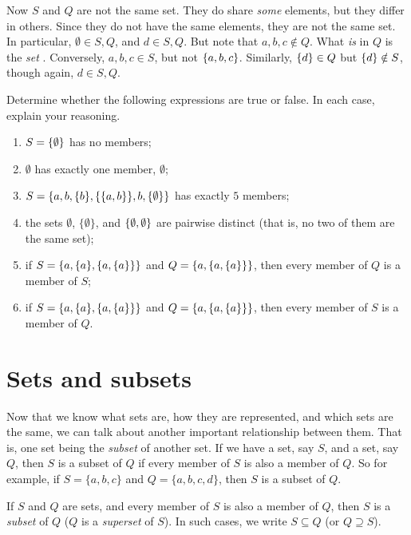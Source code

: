 Now $S$ and $Q$ are not the same set. They do share \textit{some} elements, but they differ in others. Since they do not have the same elements, they are not the same set. In particular, $\emptyset \in S, Q$, and $d \in S, Q$. But note that $a, b, c \notin Q$. What \textit{is} in $Q$ is the \textit{set} . Conversely, $a, b, c \in S$, but not $\{a, b, c\}$. Similarly, $\{d\} \in Q$ but $\{d\} \notin S$, though again, $d \in S, Q$. 

\begin{exc}
	Determine whether the following expressions are true or false. In each case, explain your reasoning. 
	
	\begin{enumerate}
	\item $S=\{\emptyset\}$ has no members;
	\item $\emptyset$ has exactly one member, $\emptyset$;
	\item $S=\{a, b, \{b\}, \{\{a, b\}\},b, \{\emptyset\}\}$ has exactly $5$ members;
	\item the sets $\emptyset$, $\{\emptyset\}$, and $\{\emptyset, \emptyset\}$ are pairwise distinct (that is, no two of them are the same set);
	\item if $S=\{a, \{a\}, \{a, \{a\}\}\}$ and $Q=\{a, \{a, \{a\}\}\}$, then every member of $Q$ is a member of $S$;
	\item if $S=\{a, \{a\}, \{a, \{a\}\}\}$ and $Q=\{a, \{a, \{a\}\}\}$, then every member of $S$ is a member of $Q$. 
	\end{enumerate}
\end{exc}

\section{Sets and subsets}

Now that we know what sets are, how they are represented, and which sets are the same, we can talk about another important relationship between them. That is, one set being the \textit{subset} of another set. If we have a set, say $S$, and a set, say $Q$, then $S$ is a subset of $Q$ if every member of $S$ is also a member of $Q$. So for example, if $S=\{a, b,c\}$ and $Q=\{a, b, c, d\}$, then $S$ is a subset of $Q$. 

\begin{defn}[Subset]
If $S$ and $Q$ are sets, and every member of $S$ is also a member of $Q$, then $S$ is a \textit{subset} of $Q$ ($Q$ is a \textit{superset} of $S$). In such cases, we write $S \subseteq Q$ (or $Q \supseteq S$). 
\end{defn}

